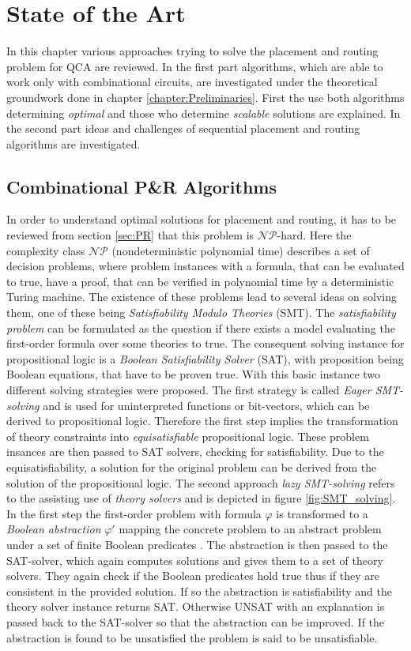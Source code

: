 \chapter{State of the Art}\label{chapter:SotA}
In this chapter various approaches trying to solve the placement and routing problem for QCA are reviewed. In the first part algorithms, which are able to work only with combinational circuits, are investigated under the theoretical groundwork done in chapter \ref{chapter:Preliminaries}. First the use both algorithms determining \textit{optimal} and those who determine \textit{scalable} solutions are explained. In the second part ideas and challenges of sequential placement and routing algorithms are investigated.

\section{Combinational P\&R Algorithms}
In order to understand optimal solutions for placement and routing, it has to be reviewed from section \ref{sec:PR} that this problem is $\mathcal{NP}$-hard. Here the complexity class $\mathcal{NP}$ (nondeterministic polynomial time) describes a set of decision problems, where problem instances with a formula, that can be evaluated to true, have a proof, that can be verified in polynomial time by a deterministic Turing machine. The existence of these problems lead to several ideas on solving them, one of these being \textit{Satisfiability Modulo Theories} (SMT). The \textit{satisfiability problem} can be formulated as the question if there exists a model evaluating the first-order formula over some theories to true. The consequent solving instance for propositional logic is a \textit{Boolean Satisfiability Solver} (SAT), with proposition being Boolean equations, that have to be proven true. With this basic instance two different solving strategies were proposed. The first strategy is called \textit{Eager SMT-solving} and is used for uninterpreted functions or bit-vectors, which can be derived to propositional logic. Therefore the first step implies the transformation of theory constraints into \textit{equisatisfiable} propositional logic. These problem insances are then passed to SAT solvers, checking for satisfiability. Due to the equisatisfiability, a solution for the original problem can be derived from the solution of the propositional logic. The second approach \textit{lazy SMT-solving} refers to the assisting use of \textit{theory solvers} and is depicted in figure \ref{fig:SMT_solving}. In the first step the first-order problem with formula $\varphi$ is transformed to a \textit{Boolean abstraction} $\varphi'$ mapping the concrete problem to an abstract problem under a set of finite Boolean predicates \cite{boolean_abstraction}. The abstraction is then passed to the SAT-solver, which again computes solutions and gives them to a set of theory solvers. They again check if the Boolean predicates hold true thus if they are consistent in the provided solution. If so the abstraction is satisfiability and the theory solver instance returns SAT. Otherwise UNSAT with an explanation is passed back to the SAT-solver so that the abstraction can be improved. If the abstraction is found to be unsatisfied the problem is said to be unsatisfiable.
\cite{SMT}

